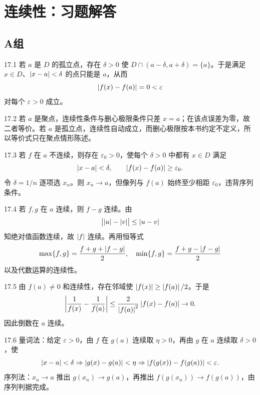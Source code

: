 \chapter{连续性：习题解答}

\section*{A组}

\begin{solution}{17.1}
若 \(a\) 是 \(D\) 的孤立点，存在 \(\delta>0\) 使 \(D\cap(a-\delta,a+\delta)=\{a\}\)。于是满足 \(x\in D\)、\(\left|x-a\right|<\delta\) 的点只能是 \(a\)，从而
\[
 \left|f(x)-f(a)\right|=0<\varepsilon
\]
对每个 \(\varepsilon>0\) 成立。
\end{solution}

\begin{solution}{17.2}
若 \(a\) 是聚点，连续性条件与删心极限条件只差 \(x=a\)；在该点误差为零，故二者等价。若 \(a\) 是孤立点，连续性自动成立，而删心极限按本书约定不定义，所以等价式只在聚点情形陈述。
\end{solution}

\begin{solution}{17.3}
若 \(f\) 在 \(a\) 不连续，则存在 \(\varepsilon_0>0\)，使每个 \(\delta>0\) 中都有 \(x\in D\) 满足
\[
 \left|x-a\right|<\delta,\qquad\left|f(x)-f(a)\right|\ge\varepsilon_0.
\]
令 \(\delta=1/n\) 逐项选 \(x_n\)。则 \(x_n\to a\)，但像列与 \(f(a)\) 始终至少相距 \(\varepsilon_0\)，违背序列条件。
\end{solution}

\begin{solution}{17.4}
若 \(f,g\) 在 \(a\) 连续，则 \(f-g\) 连续。由
\[
 \bigl|\left|u\right|-\left|v\right|\bigr|\le\left|u-v\right|
\]
知绝对值函数连续，故 \(\left|f\right|\) 连续。再用恒等式
\[
 \max\{f,g\}=\frac{f+g+\left|f-g\right|}2,\quad
 \min\{f,g\}=\frac{f+g-\left|f-g\right|}2
\]
以及代数运算的连续性。
\end{solution}

\begin{solution}{17.5}
由 \(f(a)\ne0\) 和连续性，存在邻域使 \(\left|f(x)\right|\ge\left|f(a)\right|/2\)。于是
\[
 \left|\frac1{f(x)}-\frac1{f(a)}\right|
 \le\frac2{\left|f(a)\right|^2}\left|f(x)-f(a)\right|\to0.
\]
因此倒数在 \(a\) 连续。
\end{solution}

\begin{solution}{17.6}
量词法：给定 \(\varepsilon>0\)，由 \(f\) 在 \(g(a)\) 连续取 \(\eta>0\)，再由 \(g\) 在 \(a\) 连续取 \(\delta>0\)，使
\[
 \left|x-a\right|<\delta\Rightarrow\left|g(x)-g(a)\right|<\eta
\Rightarrow\left|f(g(x))-f(g(a))\right|<\varepsilon.
\]
序列法：\(x_n\to a\) 推出 \(g(x_n)\to g(a)\)，再推出 \(f(g(x_n))\to f(g(a))\)，由序列判据完成。
\end{solution}

